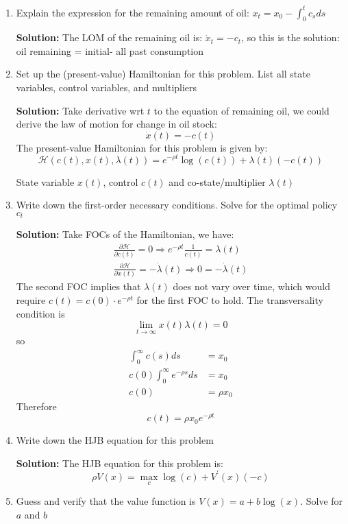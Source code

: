 \documentclass[11pt]{extarticle}
\theoremstyle{plain}
\theoremstyle{definition}
\begin{document}
\begin{enumerate}
\item Explain the expression for the remaining amount of oil: $x_t = x_0 - \int_0^t c_s ds$

\textbf{Solution:} The LOM of the remaining oil is: $\dot{x}_t = - c_t$, so this is the solution: oil remaining = initial- all past consumption

\item Set up the (present-value) Hamiltonian for this problem. List all state variables, control variables, and multipliers

\textbf{Solution:} Take derivative wrt $t$ to the equation of remaining oil, we could derive the law of motion for change in oil stock:
$$
\dot{x}(t)=-c(t)
$$
The present-value Hamiltonian for this problem is given by:
$$
\mathcal{H}(c(t), x(t), \lambda(t))=e^{-\rho t} \log (c(t))+\lambda(t)(-c(t))
$$

State variable $x(t)$, control $c(t)$ and co-state/multiplier $ \lambda(t)$

\item Write down the first-order necessary conditions. Solve for the optimal policy $c_t$

\textbf{Solution:} Take FOCs of the Hamiltonian, we have:
$$
\begin{gathered}
\frac{\partial \mathcal{H}}{\partial c(t)}=0 \Rightarrow e^{-\rho t} \frac{1}{c(t)}=\lambda(t) \\
\frac{\partial \mathcal{H}}{\partial x(t)}=-\dot{\lambda}(t) \Rightarrow 0=-\dot{\lambda}(t)
\end{gathered}
$$
The second FOC implies that $\lambda(t)$ does not vary over time, which would require $c(t)=c(0) \cdot e^{-\rho t}$ for the first FOC to hold. The transversality condition is
$$
\lim _{t \rightarrow \infty} x(t) \lambda(t)=0
$$
so
$$
\begin{aligned}
\int_0^{\infty} c(s) d s &=x_0 \\
c(0) \int_0^{\infty} e^{-\rho s} d s &=x_0 \\
c(0) &=\rho x_0
\end{aligned}
$$
Therefore
$$
c(t)=\rho x_0 e^{-\rho t}
$$

\item Write down the HJB equation for this problem

\textbf{Solution:} The HJB equation for this problem is:
$$
\rho V(x)=\max _c \log (c)+V^{\prime}(x)(-c)
$$

\item Guess and verify that the value function is $V(x) = a + b \log(x)$. Solve for $a$ and $b$


\end{enumerate}
\end{document}
